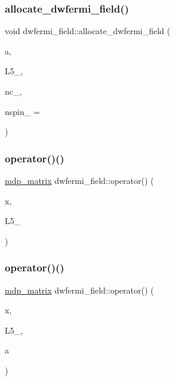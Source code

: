 \subsubsection{\texorpdfstring{allocate\+\_\+dwfermi\+\_\+field()}{allocate\_dwfermi\_field()}}
{\footnotesize\ttfamily void dwfermi\+\_\+field\+::allocate\+\_\+dwfermi\+\_\+field (\begin{DoxyParamCaption}\item[{\hyperlink{classmdp__lattice}{mdp\+\_\+lattice} \&}]{a,  }\item[{int}]{L5\+\_\+,  }\item[{int}]{nc\+\_\+,  }\item[{int}]{nspin\+\_\+ = {} }\end{DoxyParamCaption})\hspace{0.3cm}{\ttfamily [inline]}}

\mbox{\label{classdwfermi__field_a74ca9ee1a200f082bf816a306e0db58a}} 
\subsubsection{\texorpdfstring{operator()()}{operator()()}\hspace{0.1cm}{\footnotesize\ttfamily [1/4]}}
{\footnotesize\ttfamily \hyperlink{classmdp__matrix}{mdp\+\_\+matrix} dwfermi\+\_\+field\+::operator() (\begin{DoxyParamCaption}\item[{\hyperlink{mdp__compatibility__macros_8h_aa6f1179c424e48adef1cedf7c436eb75}{site}}]{x,  }\item[{int}]{L5\+\_\+ }\end{DoxyParamCaption})\hspace{0.3cm}{\ttfamily [inline]}}

\mbox{\label{classdwfermi__field_adca7e6c16994ace10946016d8d6de943}} 
\subsubsection{\texorpdfstring{operator()()}{operator()()}\hspace{0.1cm}{\footnotesize\ttfamily [2/4]}}
{\footnotesize\ttfamily \hyperlink{classmdp__matrix}{mdp\+\_\+matrix} dwfermi\+\_\+field\+::operator() (\begin{DoxyParamCaption}\item[{\hyperlink{mdp__compatibility__macros_8h_aa6f1179c424e48adef1cedf7c436eb75}{site}}]{x,  }\item[{int}]{L5\+\_\+,  }\item[{int}]{a }\end{DoxyParamCaption})\hspace{0.3cm}{\ttfamily [inline]}}

